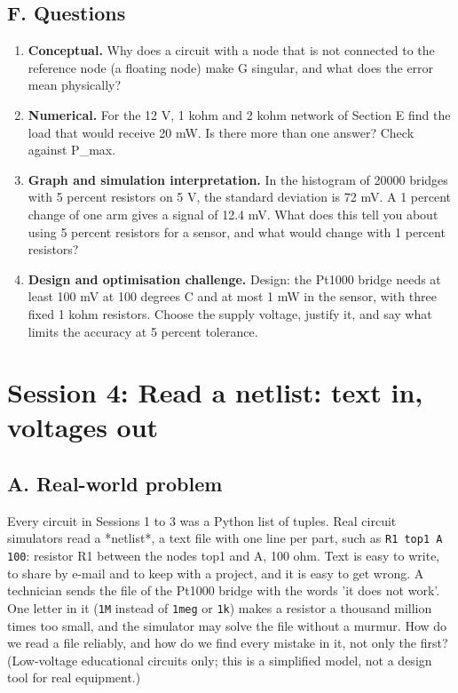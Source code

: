 \documentclass[11pt,a4paper]{article}
\begin{document}
\subsection*{F. Questions}
\begin{enumerate}[nosep]
\item \textbf{Conceptual.} Why does a circuit with a node that is not connected to the reference node (a floating node) make G singular, and what does the error mean physically?
\item \textbf{Numerical.} For the 12 V, 1 kohm and 2 kohm network of Section E find the load that would receive 20 mW. Is there more than one answer? Check against P\_max.
\item \textbf{Graph and simulation interpretation.} In the histogram of 20000 bridges with 5 percent resistors on 5 V, the standard deviation is 72 mV. A 1 percent change of one arm gives a signal of 12.4 mV. What does this tell you about using 5 percent resistors for a sensor, and what would change with 1 percent resistors?
\item \textbf{Design and optimisation challenge.} Design: the Pt1000 bridge needs at least 100 mV at 100 degrees C and at most 1 mW in the sensor, with three fixed 1 kohm resistors. Choose the supply voltage, justify it, and say what limits the accuracy at 5 percent tolerance.
\end{enumerate}

\section{Session 4: Read a netlist: text in, voltages out}

\subsection*{A. Real-world problem}
Every circuit in Sessions 1 to 3 was a Python list of tuples. Real circuit simulators read a *netlist*, a text file with one line per part, such as \texttt{R1 top1 A 100}: resistor R1 between the nodes top1 and A, 100 ohm. Text is easy to write, to share by e-mail and to keep with a project, and it is easy to get wrong. A technician sends the file of the Pt1000 bridge with the words 'it does not work'. One letter in it (\texttt{1M} instead of \texttt{1meg} or \texttt{1k}) makes a resistor a thousand million times too small, and the simulator may solve the file without a murmur. How do we read a file reliably, and how do we find every mistake in it, not only the first? (Low-voltage educational circuits only; this is a simplified model, not a design tool for real equipment.)
\end{document}
